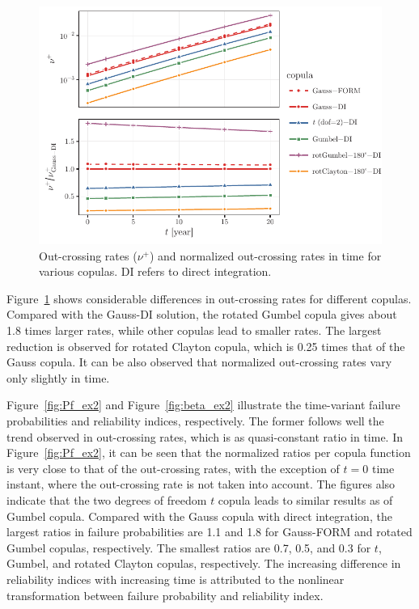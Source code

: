 \begin{figure}[htbp!] 
	\centering    
	\includegraphics[]{Sudrets_beam_log_nu.pdf}
	\caption{Out-crossing rates ($\nu ^+$) and normalized out-crossing rates in time for various copulas. DI refers to direct integration.}
	\label{fig:outcross_ex2}
\end{figure}

Figure~\ref{fig:outcross_ex2} shows considerable differences in out-crossing rates for different copulas. Compared with the Gauss-DI solution, the rotated Gumbel copula gives about 1.8 times larger rates, while other copulas lead to smaller rates. The largest reduction is observed for rotated Clayton copula, which is 0.25 times that of the Gauss copula. It can be also observed that normalized out-crossing rates vary only slightly in time.

Figure~\ref{fig:Pf_ex2} and Figure~\ref{fig:beta_ex2} illustrate the time-variant failure probabilities and reliability indices, respectively. The former follows well the trend observed in out-crossing rates, which is as quasi-constant ratio in time. In Figure~\ref{fig:Pf_ex2}, it can be seen that the normalized ratios per copula function is very close to that of the out-crossing rates, with the exception of $t=0$ time instant, where the out-crossing rate is not taken into account. The figures also indicate that the two degrees of freedom $t$ copula leads to similar results as of Gumbel copula. Compared with the Gauss copula with direct integration, the largest ratios in failure probabilities are 1.1 and 1.8 for Gauss-FORM and rotated Gumbel copulas, respectively. The smallest ratios are 0.7, 0.5, and 0.3 for $t$, Gumbel, and rotated Clayton copulas, respectively. The increasing difference in reliability indices with increasing time is attributed to the nonlinear transformation between failure probability and reliability index.

